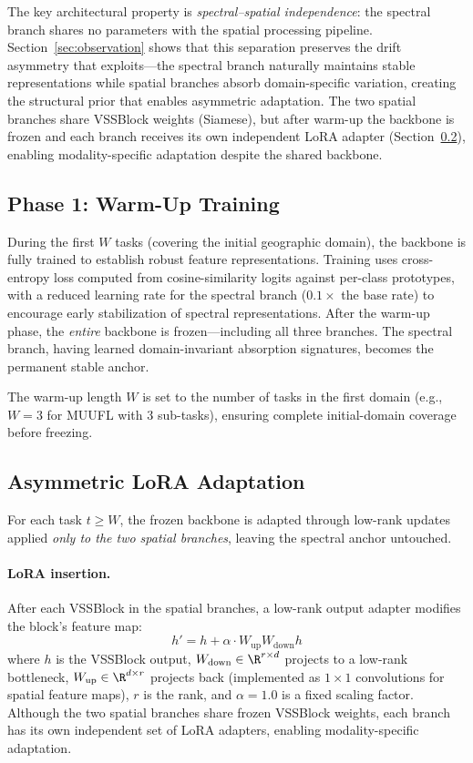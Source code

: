 The key architectural property is \emph{spectral--spatial independence}: the spectral branch shares no parameters with the spatial processing pipeline.
Section~\ref{sec:observation} shows that this separation preserves the drift asymmetry that \methodname{} exploits---the spectral branch naturally maintains stable representations while spatial branches absorb domain-specific variation, creating the structural prior that enables asymmetric adaptation.
The two spatial branches share VSSBlock weights (Siamese), but after warm-up the backbone is frozen and each branch receives its own independent LoRA adapter (Section~\ref{sec:lora}), enabling modality-specific adaptation despite the shared backbone.

\subsection{Phase 1: Warm-Up Training}
\label{sec:warmup}

During the first $W$ tasks (covering the initial geographic domain), the \backbonename{} backbone is fully trained to establish robust feature representations.
Training uses cross-entropy loss computed from cosine-similarity logits against per-class prototypes, with a reduced learning rate for the spectral branch ($0.1\times$ the base rate) to encourage early stabilization of spectral representations.
After the warm-up phase, the \emph{entire} backbone is frozen---including all three branches.
The spectral branch, having learned domain-invariant absorption signatures, becomes the permanent stable anchor.

The warm-up length $W$ is set to the number of tasks in the first domain (e.g., $W{=}3$ for MUUFL with 3 sub-tasks), ensuring complete initial-domain coverage before freezing.

\subsection{Asymmetric LoRA Adaptation}
\label{sec:lora}

For each task $t \geq W$, the frozen backbone is adapted through low-rank updates applied \emph{only to the two spatial branches}, leaving the spectral anchor untouched.

\paragraph{LoRA insertion.}
After each VSSBlock in the spatial branches, a low-rank output adapter modifies the block's feature map:
\begin{equation}
    h' = h + \alpha \cdot W_{\mathrm{up}} W_{\mathrm{down}} h
\label{eq:lora}
\end{equation}
where $h$ is the VSSBlock output, $W_{\mathrm{down}} \in \R^{r \times d}$ projects to a low-rank bottleneck, $W_{\mathrm{up}} \in \R^{d \times r}$ projects back (implemented as $1{\times}1$ convolutions for spatial feature maps), $r$ is the rank, and $\alpha{=}1.0$ is a fixed scaling factor.
Although the two spatial branches share frozen VSSBlock weights, each branch has its own independent set of LoRA adapters, enabling modality-specific adaptation.

